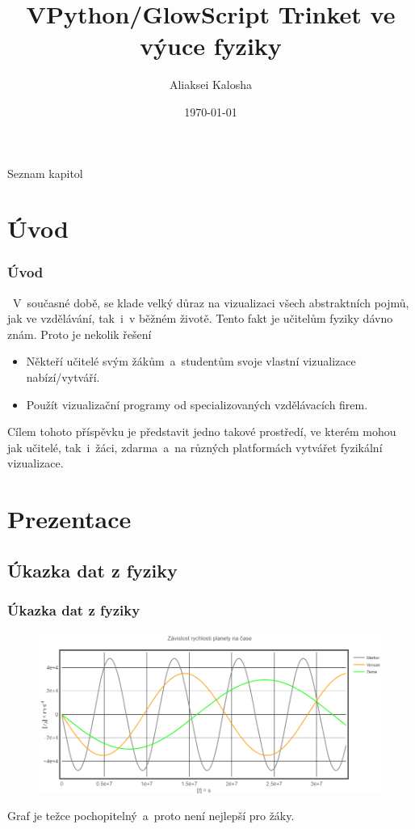 \documentclass[hyperref={unicode}]{beamer}
\title[prezentace]{VPython/GlowScript Trinket ve výuce fyziky}
\author{Aliaksei Kalosha}
\institute{TUL}
\date{\today}
\begin{document}
\begin{frame}
  \titlepage
\end{frame}

\begin{frame}{Seznam kapitol}
    \tableofcontents
\end{frame}

\section{Úvod}
\begin{frame}
    \frametitle{Úvod}
    ~V~současné době, se klade velký důraz na vizualizaci všech abstraktních pojmů, jak ve vzdělávání, tak~i~v běžném životě. Tento fakt je učitelům fyziky dávno znám. Proto je nekolik řešení
    \begin{itemize}
        \item Někteří učitelé svým žákům~a~studentům svoje vlastní vizualizace nabízí/vytváří.
        \item Použít vizualizační programy od specializovaných vzdělávacích firem.
    \end{itemize}
   Cílem tohoto příspěvku je představit jedno takové prostředí, ve kterém mohou jak učitelé, tak~i~žáci, zdarma~a~na různých platformách vytvářet fyzikální vizualizace.
\end{frame}

\section{Prezentace}
\subsection{Úkazka dat z fyziky}
\begin{frame}
    \frametitle{Úkazka dat z fyziky}
     \begin{figure}
        \centering
        \includegraphics[width=\textwidth]{img1.png}
    \end{figure}
    Graf je težce pochopitelný~a~proto není nejlepší pro žáky.
\end{frame}
\end{document}
